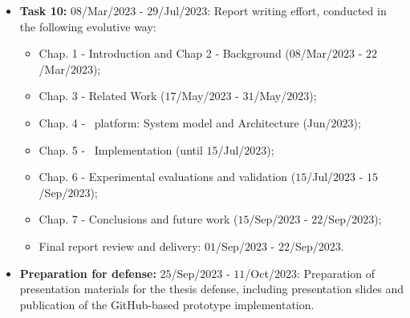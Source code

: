 \begin{itemize}    
    \item \textbf{Task 10:} $08$/Mar/$2023$ - $29$/Jul/$2023$: Report writing effort, conducted in the following evolutive way:
    \begin{itemize}
        \item Chap. 1 - Introduction and Chap 2 - Background ($08$/Mar/$2023$ - $22$/Mar/$2023$);
        \item Chap. 3 - Related Work ($17$/May/$2023$ - $31$/May/$2023$);
        \item Chap. 4 - \mysystem~platform: System model and Architecture (Jun/$2023$);
        \item Chap. 5 - \mysystem~Implementation (until $15$/Jul/$2023$);
        \item Chap. 6 - Experimental evaluations and validation ($15$/Jul/$2023$ - $15$/Sep/$2023$);
        \item Chap. 7 - Conclusions and future work ($15$/Sep/$2023$ - $22$/Sep/$2023$);
        \item Final report review and delivery: $01$/Sep/$2023$ - $22$/Sep/$2023$.
    \end{itemize}

    \item \textbf{Preparation for defense:} $25$/Sep/$2023$ - $11$/Oct/$2023$: Preparation of presentation materials for the thesis defense, including presentation slides and publication of the GitHub-based prototype implementation.
\end{itemize}